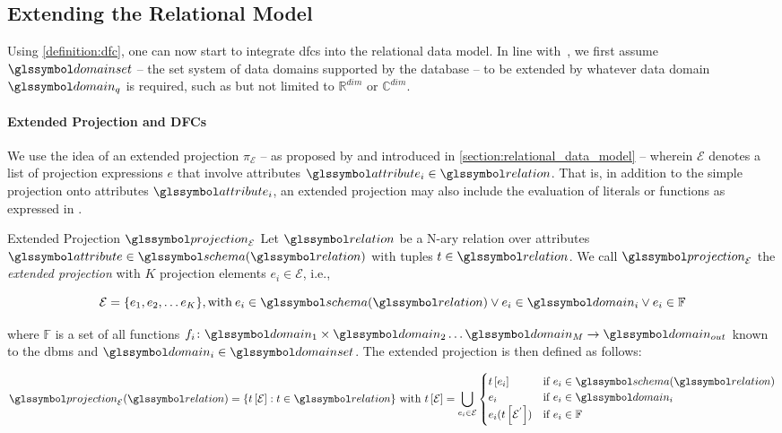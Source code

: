 \subsection{Extending the Relational Model}

Using \cref{definition:dfc}, one can now start to integrate \acrshort{dfc}s into the relational data model. In line with~\cite{Giangreco:2018Database}, we first assume $\domainset$ -- the set system of data domains supported by the database -- to be extended by whatever data domain $\domain_q$ is required, such as but not limited to $\mathbb{R}^{dim}$ or $\mathbb{C}^{dim}$. 

\paragraph{Extended Projection and DFCs}

We use the idea of an extended projection $\pi_{\mathcal{E}}$ -- as proposed by \cite{Gupta:1995Generalized,Garcia:2009Database} and introduced in \cref{section:relational_data_model} -- wherein $\mathcal{E}$ denotes a list of projection expressions $e$ that involve attributes $\attribute_i \in \relation$. That is, in addition to the simple projection onto attributes $\attribute_i$, an extended projection may also include the evaluation of literals or functions as expressed in . 

\begin{definition}[label=definition:extended_projection]{Extended Projection $\projection_\mathcal{E}$}{}
Let $\relation$ be a N-ary relation over attributes $\attribute \in \schema (\relation)$ with tuples $t \in \relation$. We call $\projection_\mathcal{E}$ the \emph{extended projection} with $K$ projection elements $e_i \in \mathcal{E}$, i.e.,

\begin{equation*}
    \mathcal{E} = \{ e_1, e_2, \ldots e_K \}, \textrm{with} \: e_i \in \schema(\relation) \vee e_i \in \domain_i \vee e_i \in \mathbb{F}
\end{equation*}

where $\mathbb{F}$ is a set of all functions $f_i \colon \domain_{1} \times \domain_{2} \ldots \domain_{M} \rightarrow \domain_{out}$ known to the \acrshort{dbms} and $\domain_i \in \domainset$. The extended projection is then defined as follows:

\begin{equation*}
    \projection_{\mathcal{E}}(\relation) =  \{ t\left[ \mathcal{E} \right] : t \in \relation \} \textrm{ with } t\left[ \mathcal{E} \right] = \bigcup_{e_i \in \mathcal{E}}
    \begin{cases} 
        t \left[ e_i \right] & \text{if } e_i \in \schema(\relation) \\
        e_i  & \text{if } e_i \in \domain_i \\
        e_i(t \left[ \mathcal{E}^{'} \right]) & \text{if } e_i \in \mathbb{F} \\
    \end{cases}
\end{equation*}
\end{definition}

